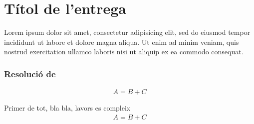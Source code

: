 \setcounter{section}{0}
\setcounter{page}{1}
\section{Títol de l'entrega} %
Lorem ipsum dolor sit amet, consectetur adipisicing elit, sed do eiusmod tempor incididunt ut labore et dolore magna aliqua. Ut enim ad minim veniam, quis nostrud exercitation ullamco laboris nisi ut aliquip ex ea commodo consequat.

\subsubsection*{Resolució de }
\begin{align*}
	\boxed{ A = B + C }
\end{align*}
\begin{sproof}
	Primer de tot, bla bla, lavors es compleix
	\begin{align}
		A = B + C
	\end{align}
\end{sproof}
